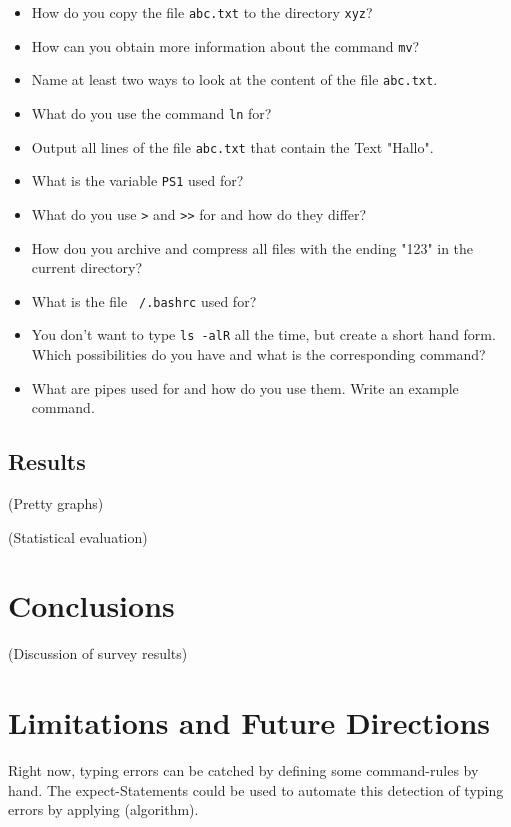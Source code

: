 \documentclass[twoside]{scrreprt}
\begin{document}
\begin{itemize}
    \item How do you copy the file \texttt{abc.txt} to the directory \texttt{xyz}?
    \item How can you obtain more information about the command \texttt{mv}?
    \item Name at least two ways to look at the content of the file \texttt{abc.txt}.
    \item What do you use the command \texttt{ln} for?
    \item Output all lines of the file \texttt{abc.txt} that contain the Text "Hallo".
    \item What is the variable \texttt{PS1} used for?
    \item What do you use \texttt{>} and \texttt{>>} for and how do they differ?
    \item How dou you archive and compress all files with the ending "123" in the current directory?
    \item What is the file \texttt{~/.bashrc} used for?
    \item You don't want to type \texttt{ls -alR} all the time, but create a short hand form. Which possibilities do you have and what is the corresponding command?
    \item What are pipes used for and how do you use them. Write an example command.
\end{itemize}

\section{Results}

(Pretty graphs)

(Statistical evaluation)

\chapter{Conclusions}

(Discussion of survey results)

\chapter{Limitations and Future Directions}

Right now, typing errors can be catched by defining some command-rules by hand. The expect-Statements could be used to automate this detection of typing errors by applying (algorithm).
\end{document}
